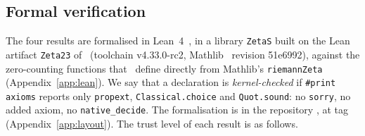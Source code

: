 \subsection{Formal verification}\label{ssec:formal}
The four results are formalised in Lean~4~\cite{Lean4}, in a library \texttt{ZetaS} built on the Lean artifact
\texttt{Zeta23} of~\cite{AF} (toolchain v4.33.0-rc2, Mathlib~\cite{Mathlib} revision 51e6992), against the zero-counting functions that~\cite{AF} define
directly from Mathlib's \texttt{riemannZeta} (Appendix~\ref{app:lean}). We say that a declaration is \emph{kernel-checked} if
\texttt{\#print axioms} reports only \texttt{propext}, \texttt{Classical.choice} and \texttt{Quot.sound}: no \texttt{sorry}, no added axiom,
no \texttt{native\_decide}. The formalisation is in the repository \repourl, at tag \repotag{} (Appendix~\ref{app:layout}). The
trust level of each result is as follows.
